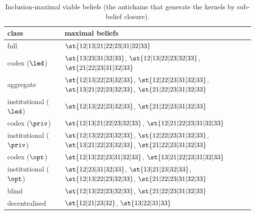 \begin{table}[H]
\centering\footnotesize
\caption{Inclusion-maximal viable beliefs (the antichains that generate the kernels by sub-belief closure).}
\label{tab:maximal}
\begin{tabular}{lp{}}
\toprule
class & maximal beliefs \\
\midrule
full & $\st{12|13|21|22|23|31|32|33}$ \\
codex ($\led$) & $\st{13|23|31|32|33}$, $\st{12|13|22|23|32|33}$, $\st{21|22|23|31|32|33}$ \\
aggregate & $\st{12|13|22|23|32|33}$, $\st{12|22|23|31|32|33}$, $\st{13|21|22|23|32|33}$, $\st{21|22|23|31|32|33}$ \\
institutional ($\led$) & $\st{12|13|22|23|32|33}$, $\st{21|22|23|31|32|33}$ \\
codex ($\priv$) & $\st{12|13|21|22|23|32|33}$, $\st{12|21|22|23|31|32|33}$ \\
institutional ($\priv$) & $\st{12|13|22|23|32|33}$, $\st{12|22|23|31|32|33}$, $\st{13|21|22|23|32|33}$, $\st{21|22|23|31|32|33}$ \\
codex ($\opt$) & $\st{12|13|22|23|31|32|33}$, $\st{13|21|22|23|31|32|33}$ \\
institutional ($\opt$) & $\st{12|23|31|32|33}$, $\st{13|21|23|32|33}$, $\st{12|13|22|23|32|33}$, $\st{21|22|23|31|32|33}$ \\
blind & $\st{12|13|22|23|32|33}$, $\st{21|22|23|31|32|33}$ \\
decentralised & $\st{12|21|23|32}$, $\st{13|22|31|33}$ \\
\bottomrule
\end{tabular}
\end{table}
